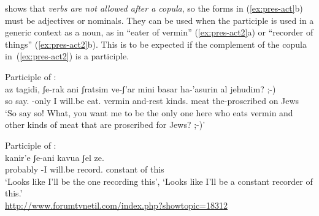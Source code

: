 \begin{exe}
\begin{xlist}
\begin{exe}
\begin{xlist}
\begin{exe}
\begin{exe}
\begin{xlist}
\begin{exe}
\begin{exe}
\begin{xlist}
\begin{exe}
\begin{xlist}
\begin{exe}
\begin{xlist}
\begin{exe}
\begin{xlist}
\begin{exe}
\begin{xlist}
\begin{xlist}
\begin{exe}
\begin{xlist}
\begin{exe}
\begin{xlist}
\begin{exe}
\begin{exe}
\begin{exe}
\begin{xlist}
\begin{exe}
\begin{exe}
\begin{xlist}
\begin{exe}
\begin{xlist}
 \z
\z 
\cite{doron00} shows that \textit{verbs are not allowed after a copula}, so the forms in (\ref{ex:pres-act}b) must be adjectives or nominals. They can be used when the participle is used in a generic context as a noun, as in ``eater of vermin'' (\ref{ex:pres-act2}a) or ``recorder of things'' (\ref{ex:pres-act2}b). This is to be expected if the complement of the copula in~(\ref{ex:pres-act2}) is a participle.
 \begin{exe}
 \ex  \label{ex:pres-act2} 
 \begin{xlist} 
  \ex  Participle of {\tkal}: \\
	{ \gll az tagidi, ʃe-rak ani   ʃratsim ve-ʃ'ar mini basar ha-'asurin al jehudim? ;-)\\
        so say. -only I will.be eat. vermin and-rest kinds. meat the-proscribed on Jews\\
      \glt `So say so! What, you want me to be the only one here who eats vermin and other kinds of meat that are proscribed for Jews? ;-)'\footnotemark } 
 

  \ex  Participle of {\thif}: \\
 	{ \gll kanir'e ʃe-ani   kavua ʃel ze.\\
        probably -I will.be record. constant of this\\
      \glt `Looks like I'll be the one recording this', `Looks like I'll be a constant recorder of this.'\\
        \url{http://www.forumtvnetil.com/index.php?showtopic=18312} } 
 
 \z
\z 


\end{xlist}
\end{exe}
\end{xlist}
\end{exe}
\end{xlist}
\end{exe}
\end{exe}
\end{xlist}
\end{exe}
\end{exe}
\end{exe}
\end{xlist}
\end{exe}
\end{xlist}
\end{exe}
\end{xlist}
\end{xlist}
\end{exe}
\end{xlist}
\end{exe}
\end{xlist}
\end{exe}
\end{xlist}
\end{exe}
\end{xlist}
\end{exe}
\end{exe}
\end{xlist}
\end{exe}
\end{exe}
\end{xlist}
\end{exe}
\end{xlist}
\end{exe}
